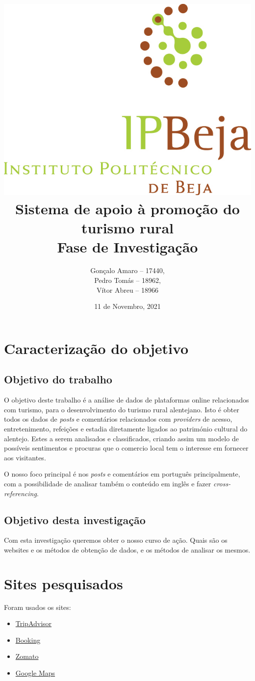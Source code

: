 \documentclass[a4paper,10pt]{article}
\title{\includegraphics[scale=0.5]{ipbeja_logo.png}\\[0.5cm]Sistema de apoio à promoção do turismo rural\\Fase de Investigação} %
\author{Gonçalo Amaro -- 17440,\\ Pedro Tomás -- 18962,\\ Vítor Abreu -- 18966} %
\date{11 de Novembro, 2021} %
\begin{document}
\maketitle

\newpage

{
  \hypersetup{linkcolor=black}
  \tableofcontents
}

\newpage

\section{Caracterização do objetivo}
\subsection{Objetivo do trabalho}

O objetivo deste trabalho é a análise de dados de plataformas online relacionados com turismo, para o desenvolvimento do turismo rural alentejano.
Isto é obter todos os dados de \textit{posts} e comentários relacionados com \textit{providers} de acesso, entretenimento, refeições e estadia diretamente ligados ao património cultural do alentejo.
Estes a serem analisados e classificados, criando assim um modelo de possíveis sentimentos e procuras que o comercio local tem o interesse em fornecer aos visitantes.

O nosso foco principal é nos \textit{posts} e comentários em português principalmente, com a possibilidade de analisar também o conteúdo em inglês e fazer \textit{cross-referencing}.

\subsection{Objetivo desta investigação}

Com esta investigação queremos obter o nosso curso de ação.
Quais são os websites e os métodos de obtenção de dados, e os métodos de analisar os mesmos.

\section{Sites pesquisados}

Foram usados os sites:
\begin{itemize}
    \item \href{https://www.tripadvisor.com/}{TripAdvisor}
    \item \href{https://www.booking.com/}{Booking}
    \item \href{https://www.zomato.com/}{Zomato}
    \item \href{https://developers.google.com/maps}{Google Maps}
\end{itemize}
\end{document}
